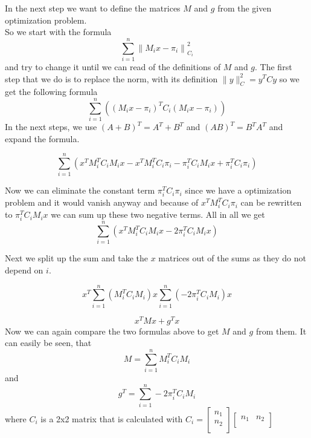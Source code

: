 \documentclass{article}
\numberwithin{equation}{section}
\newcommand{\0}{\mathbf{0}}
\begin{document}
\begin{enumerate}
\begin{enumerate}
		In the next step we want to define the matrices $M$ and $g$ from the given optimization problem. \\
		So we start with the formula 
		\[ 
		\sum_{i=1}^{n}\left\|M_{i}   x-\pi_{i}\right\|_{C_i}^{2}
		\]
		and try to change it until we can read of the definitions of $M$ and $g$.
		\newline
		The first step that we do is to replace the norm, with its definition $\|y\|_C^2 = y^T   C   y$ so we get the following formula
		\[ 
		\sum_{i=1}^{n} ((M_{i}   x-\pi_{i})^T   C_i   (M_i   x - \pi_i))
		\]
		In the next steps, we use $ (A+B)^T = A^T + B^T$ and $(A   B)^T = B^T   A^T$ and expand the formula.
		
		 \[ 
		 \sum_{i=1}^{n} (x^T   M_i^T   C_i   M_i   x - x^T   M_i^T   C_i   \pi_i - \pi_i^T   C_i   M_i   x + \pi^T_i   C_i   \pi_i)
		 \]
		
		Now we can eliminate the constant term $\pi^T_i   C_i   \pi_i$ since we have a optimization problem and it would vanish anyway and because of $x^T   M_i^T   C_i   \pi_i$ can be rewritten to $\pi_i^T   C_i   M_i   x$ we can sum up these two negative terms. All in all we get 
		\[ 
		\sum_{i=1}^{n} (x^T   M_i^T   C_i   M_i   x - 2   \pi_i^T   C_i   M_i   x)
		\]
		
		Next we split up the sum and take the $x$ matrices out of the sums as they do not depend on $i$.
		
		\[ 
		x^T \sum_{i=1}^{n} (  M_i^T   C_i   M_i)   x \sum_{i=1}^{n} (- 2   \pi_i^T   C_i   M_i )  x
		\]
		
		\[
		x^{T} M x+g^{T} x 
		\]
		Now we can again compare the two formulas above to get $M$ and $g$ from them.
		It can easily be seen, that 
		\[ 
		M = \sum_{i=1}^{n} M_i^T   C_i   M_i
		\]
		and 
		\[ 
		g^T = \sum_{i=1}^{n} - 2   \pi_i^T   C_i   M_i 
		\]
		where $C_i$ is a 2x2 matrix that is calculated with $C_i =  \begin{bmatrix} 
		n_1\\
		n_2\\
		\end{bmatrix}
		\begin{bmatrix} 
		n_1 & n_2\\
		\end{bmatrix}$


\end{enumerate}
\end{enumerate}
\end{document}
